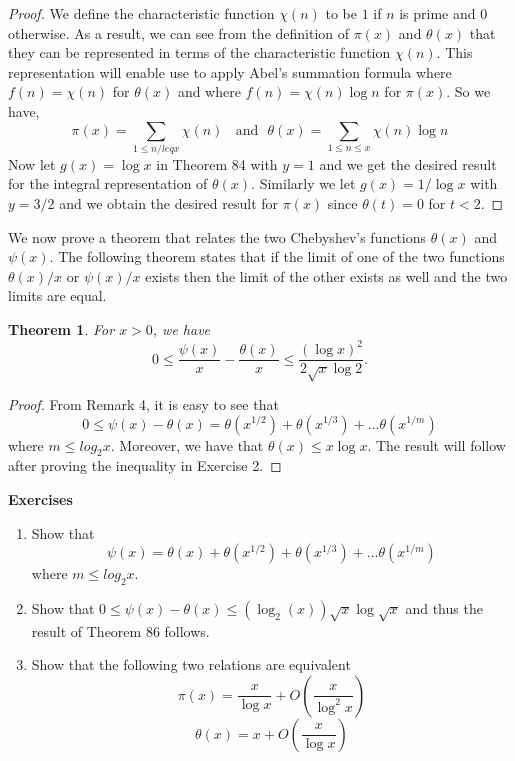 \documentclass[12pt,letterpaper]{book}
\newtheorem{theorem}{Theorem}
\begin{document}
\begin{proof}
We define the characteristic function $\chi(n)$ to be $1$ if $n$ is
prime and $0$ otherwise.  As a result, we can see from the
definition of $\pi(x)$ and $\theta(x)$ that they can be represented
in terms of the characteristic function $\chi(n)$.  This
representation will enable use to apply Abel's summation formula
where $f(n)=\chi(n)$ for $\theta(x)$ and where $f(n)=\chi(n) \log n$
for $\pi(x)$.  So we have,
\begin{equation*}
\pi(x)=\sum_{1\leq n/leq x}\chi(n) \ \ \ \  \mbox{and} \ \ \
\theta(x)=\sum_{1\leq n\leq x}\chi(n)\log n
\end{equation*}
Now let $g(x)=\log x$ in Theorem 84 with $y=1$ and we get the
desired result for the integral representation of $\theta(x)$.
Similarly we let $g(x)=1/\log x$ with $y=3/2$ and we obtain the
desired result for $\pi(x)$ since $\theta(t)=0$ for $t<2$.
\end{proof}
\par We now prove a theorem that relates the two Chebyshev's
functions $\theta(x)$ and $\psi(x)$.  The following theorem states
that if the limit of one of the two functions $\theta(x)/x$ or
$\psi(x)/x$ exists then the limit of the other exists as well and
the two limits are equal.
\begin{theorem}
For $x>0$, we have
\begin{equation*}
0 \leq \frac{\psi(x)}{x}-\frac{\theta(x)}{x}\leq \frac{(\log
x)^2}{2\sqrt{x}\log 2}.
\end{equation*}
\end{theorem}
\begin{proof}
From Remark 4, it is easy to see that
\begin{equation*}
0\leq \psi(x)-\theta(x)=\theta(x^{1/2})+
\theta(x^{1/3})+...\theta(x^{1/m})
\end{equation*}
where $m\leq log_2x$.  Moreover, we have that $\theta(x)\leq x\log
x$.  The result will follow after proving the inequality in Exercise
2.
\end{proof}
\textbf{Exercises}
\begin{enumerate}
\item{Show that \begin{equation*}
\psi(x)=\theta(x)+\theta(x^{1/2})+
\theta(x^{1/3})+...\theta(x^{1/m})
\end{equation*}
where $m\leq log_2x$.}
\item{Show that $0\leq \psi(x)-\theta(x)\leq (\log_2(x))\sqrt{x}\log\sqrt{x}$ and thus the result of Theorem 86 follows.}
\item{Show that the following two relations are equivalent
\begin{equation*}
\pi(x)=\frac{x}{\log x}+O\left(\frac{x}{\log^2x}\right)
\end{equation*}
\begin{equation*}
\theta(x)=x+O\left(\frac{x}{\log x}\right)
\end{equation*}}
\end{enumerate}
\end{document}
